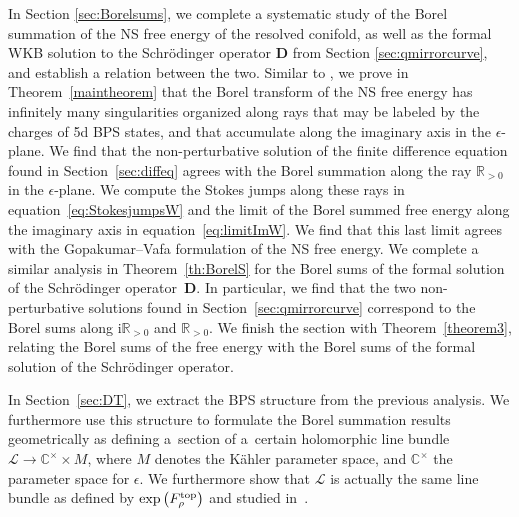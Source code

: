 \documentclass[pdftex]{sigma}
\numberwithin{equation}{section}
\begin{document}
In Section \ref{sec:Borelsums}, we complete a systematic study of the Borel summation of the NS free energy of the resolved conifold, as well as the formal WKB solution to the Schr\"odinger operator $\mathbf{D}$ from Section \ref{sec:qmirrorcurve}, and establish a relation between the two. Similar to \cite{ASTT21}, we prove in Theorem~\ref{maintheorem} that the Borel transform of the NS free energy has infinitely many singularities organized along rays that may be labeled by the charges of 5d BPS states, and that accumulate along the imaginary axis in the $\epsilon$-plane. We find that the non-perturbative solution of the finite difference equation found in Section~\ref{sec:diffeq} agrees with the Borel summation along the ray $\mathbb{R}_{>0}$ in the $\epsilon$-plane. We compute the Stokes jumps along these rays in equation~\eqref{eq:StokesjumpsW} and the limit of the Borel summed free energy along the imaginary axis in equation~\eqref{eq:limitImW}. We find that this last limit agrees with the Gopakumar--Vafa formulation of the NS free energy.
We complete a similar analysis in Theorem~\ref{th:BorelS} for the Borel sums of the formal solution of the Schr\"odinger operator~$\mathbf{D}$. In particular, we find that the two non-perturbative solutions found in Section~\ref{sec:qmirrorcurve} correspond to the Borel sums along $\mathrm{i}\mathbb{R}_{>0}$ and $\mathbb{R}_{>0}$. We finish the section with Theorem~\ref{theorem3}, relating the Borel sums of the free energy with the Borel sums of the formal solution of the Schr\"odinger operator.

In Section~\ref{sec:DT}, we extract the BPS structure from the previous analysis. We furthermore use this structure to formulate the Borel summation results geometrically as defining a~section of a~certain holomorphic line bundle $\mathcal{L}\to \mathbb{C}^{\times}\times M$, where $M$ denotes the K\"{a}hler parameter space, and $\mathbb{C}^{\times}$ the parameter space for $\epsilon$. We furthermore show that $\mathcal{L}$ is actually the same line bundle as defined by $\exp\big(F^{{\rm top}}_{\rho}\big)$ and studied in~\cite{ASTT21}.
\end{document}
